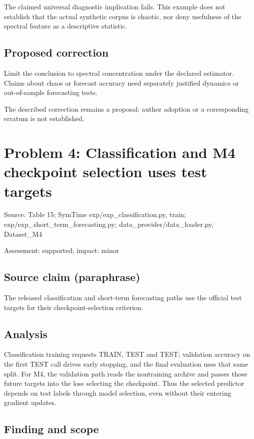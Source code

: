 \documentclass[11pt]{article}
\begin{document}
The claimed universal diagnostic implication fails. This example does not establish that the actual synthetic corpus is chaotic, nor deny usefulness of the spectral feature as a descriptive statistic.

\subsection*{Proposed correction}

Limit the conclusion to spectral concentration under the declared estimator. Claims about chaos or forecast accuracy need separately justified dynamics or out-of-sample forecasting tests.

The described correction remains a proposal; author adoption or a corresponding erratum is not established.

\section*{Problem 4: Classification and M4 checkpoint selection uses test targets}

Source: Table 15; SymTime exp/exp\_classification.py, train; exp/exp\_short\_term\_forecasting.py; data\_provider/data\_loader.py, Dataset\_M4

Assessment: supported; impact: minor

\subsection*{Source claim (paraphrase)}

The released classification and short-term forecasting paths use the official test targets for their checkpoint-selection criterion.

\subsection*{Analysis}

Classification training requests TRAIN, TEST and TEST; validation accuracy on the first TEST call drives early stopping, and the final evaluation uses that same split. For M4, the validation path reads the nontraining archive and passes those future targets into the loss selecting the checkpoint. Thus the selected predictor depends on test labels through model selection, even without their entering gradient updates.

\subsection*{Finding and scope}
\end{document}
